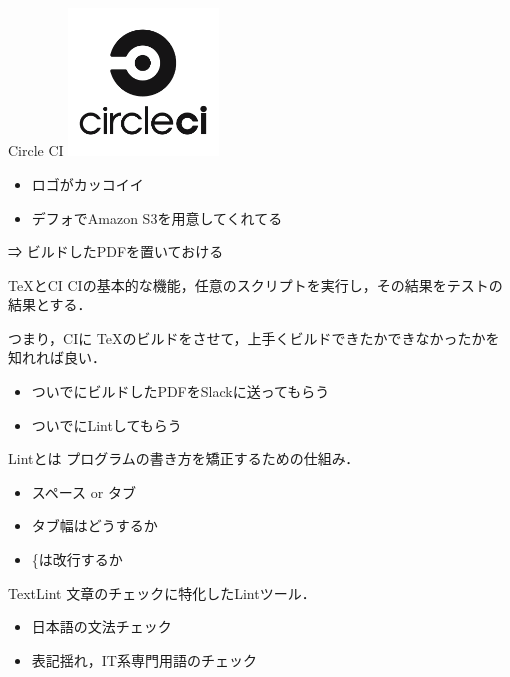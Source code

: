 \documentclass{beamer}
\begin{document}
\begin{frame}{Circle CI}
  \includegraphics[width=4cm, bb=0 0 140 137]{img/circle-logo-stacked-black.png}

  \begin{itemize}
    \item ロゴがカッコイイ
    \item デフォでAmazon S3を用意してくれてる
  \end{itemize}

  ⇒ \alert{ビルドしたPDFを置いておける}
\end{frame}

\begin{frame}{\TeX とCI}
  CIの基本的な機能，任意のスクリプトを実行し，その結果をテストの結果とする．

  つまり，\alert{CIに \TeX のビルドをさせて，上手くビルドできたかできなかったかを知れれば良い}．

  \begin{itemize}
    \item ついでにビルドしたPDFをSlackに送ってもらう
    \item ついでにLintしてもらう
  \end{itemize}
\end{frame}

\begin{frame}{Lintとは}
  プログラムの書き方を矯正するための仕組み．

  \begin{itemize}
    \item スペース or タブ
    \item タブ幅はどうするか
    \item \{は改行するか
  \end{itemize}
\end{frame}

\begin{frame}{TextLint}
  文章のチェックに特化したLintツール．

  \begin{itemize}
    \item 日本語の文法チェック
    \item 表記揺れ，IT系専門用語のチェック
  \end{itemize}
\end{frame}
\end{document}
